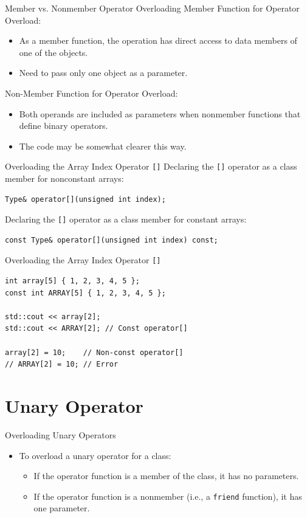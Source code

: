 \documentclass[14pt,aspectratio=1610, hyperref={pdfpagelayout=SinglePage}]{beamer}
\begin{document}
\begin{frame}[fragile]{Member vs. Nonmember Operator Overloading}
Member Function for Operator Overload:
\begin{itemize}
  \item
    As a member function, the operation has direct access to data
    members of one of the objects.
  \item
    Need to pass only one object as a parameter.
\end{itemize}

Non-Member Function for Operator Overload:
\begin{itemize}
  \item
    Both operands are included as parameters when nonmember functions that define binary operators.
  \item
    The code may be somewhat clearer this way.
\end{itemize}
\end{frame}

\begin{frame}[fragile]{Overloading the Array Index Operator \texttt{[]}}
Declaring the \lstinline{[]} operator as a class member for
  nonconstant arrays:
\begin{lstlisting}
Type& operator[](unsigned int index);
\end{lstlisting}

Declaring the \lstinline{[]} operator as a class member for
  constant arrays:
\begin{lstlisting}
const Type& operator[](unsigned int index) const;
\end{lstlisting}
\end{frame}

\begin{frame}[fragile]{Overloading the Array Index Operator \texttt{[]}}
\begin{lstlisting}
int array[5] { 1, 2, 3, 4, 5 };
const int ARRAY[5] { 1, 2, 3, 4, 5 };

std::cout << array[2];
std::cout << ARRAY[2]; // Const operator[]

array[2] = 10;    // Non-const operator[]
// ARRAY[2] = 10; // Error
\end{lstlisting}
\end{frame}

\section{Unary Operator}

\begin{frame}[fragile]{Overloading Unary Operators}
\begin{itemize}
\item
  To overload a unary operator for a class:
  \begin{itemize}
  \item
    If the operator function is a member of the class, it has no
    parameters.
  \item
    If the operator function is a nonmember (i.e., a \lstinline{friend}
    function), it has one parameter.
  \end{itemize}
\end{itemize}
\end{frame}
\end{document}
